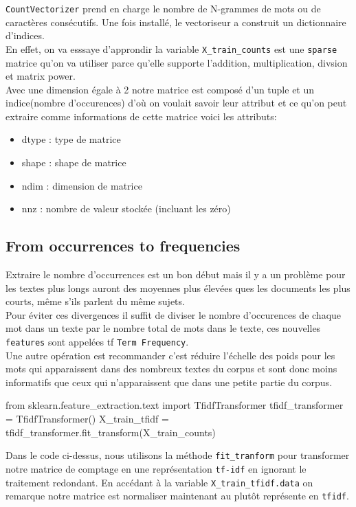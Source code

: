 \documentclass[english,a4paper,11pt,oneside]{article}
\begin{document}
{{{				\texttt{CountVectorizer} prend en charge le nombre de N-grammes de mots ou de caractères consécutifs. Une fois installé, le vectoriseur a construit un dictionnaire d'indices.\\
				En effet, on va esssaye d'approndir la variable \texttt{X\_train\_counts} est une \texttt{sparse} matrice qu'on va utiliser parce qu'elle supporte l'addition, multiplication, divsion et matrix power.\\
				Avec une dimension égale à 2 notre matrice est composé d'un tuple et un indice(nombre d'occurences) d'où on voulait savoir leur attribut et ce qu'on peut extraire comme informations de cette matrice voici les attributs:
				\begin{itemize}
					\item dtype : type de matrice
					\item shape : shape de matrice
					\item ndim  : dimension de matrice 
					\item nnz   : nombre de valeur stockée (incluant les zéro)
				\end{itemize}
				
			}
		}
		\subsection{From occurrences to frequencies}{
		 Extraire le nombre d'occurrences est un bon début mais il y a un problème pour les textes plus longs auront des moyennes plus élevées ques les documents les plus courts, même s'ils parlent du même sujets.\\
		 Pour éviter ces divergences il suffit de diviser le nombre d'occurences de chaque mot dans un texte par le nombre total de mots dans le texte, ces nouvelles \texttt{features} sont appelées tf \texttt{Term Frequency}.\\
		 Une autre opération est recommander c'est réduire l'échelle des poids pour les mots qui apparaissent dans des nombreux textes du corpus et sont donc moins informatifs que ceux qui n'apparaissent que dans une petite partie du corpus.\\
		 \newpage
		 \begin{pythonn}
from sklearn.feature_extraction.text import TfidfTransformer
tfidf_transformer = TfidfTransformer()
X_train_tfidf = tfidf_transformer.fit_transform(X_train_counts)
		 \end{pythonn}
		 Dans le code ci-dessus, nous utilisons la méthode \texttt{fit\_tranform} pour transformer notre matrice de comptage en une représentation \texttt{tf-idf} en ignorant le traitement redondant.
		 En accédant à la variable \texttt{X\_train\_tfidf.data} on remarque notre matrice est normaliser maintenant au plutôt représente en \texttt{tfidf}.\\
		 
}}
\end{document}
